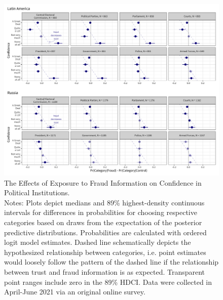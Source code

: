 \documentclass[11pt, ngerman,english,a4]{article}
\begin{document}
\begin{figure}[H]
	\centering
	\includegraphics[width=\linewidth,trim=4 4 4 4,clip]{figs/main_hdi89_1.png}
	\caption{The Effects of Exposure to Fraud Information on Confidence in Political Institutions.  \\
		\footnotesize{Notes: Plots depict medians and 89\% highest-density continuous intervals for differences in probabilities for choosing respective categories based on draws from the expectation of the posterior predictive distributions. Probabilities are calculated with ordered logit model estimates.
			Dashed line schematically depicts the hypothesized relationship between categories, i.e. point estimates would loosely follow the pattern of the dashed line if the relationship between trust and fraud information is as expected. Transparent point ranges include zero in the 89\% HDCI.
	Data were collected in April-June 2021 via an original online survey. } }
	\singlespacing
	\raggedright
	    
	\label{fig:main}
\end{figure}
\end{document}
